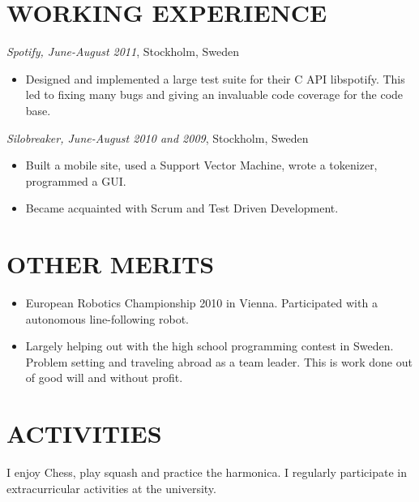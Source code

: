 \documentclass[11pt]{res} %
\begin{document}
\begin{resume}
\section{WORKING EXPERIENCE}
\emph{Spotify, June-August 2011}, Stockholm, Sweden
\vspace{0.2in}
   \begin{itemize} %
   \item Designed and implemented a large test
    suite for their C API libspotify.
    This led to fixing many bugs and giving an
    invaluable code coverage for the code base.
 \end{itemize}


\emph{Silobreaker, June-August 2010 and 2009}, Stockholm, Sweden
\vspace{0.2in}
 \begin{itemize} %
  \item Built a mobile site, used a Support Vector Machine, wrote a tokenizer,
   programmed a GUI.
  \item Became acquainted with Scrum and Test Driven Development.
\end{itemize}

\section{OTHER MERITS}

   \begin{itemize} %
   \item European Robotics Championship 2010 in Vienna.
    Participated with a autonomous line-following robot.
   \item Largely helping out with the high school programming contest in Sweden.
    Problem setting and traveling abroad as a team leader.
    This is work done out of good will and without profit.
 \end{itemize}

\section{ACTIVITIES}

I enjoy Chess, play squash and practice the harmonica.
I regularly participate in extracurricular
activities at the university.


\end{resume}
\end{document}
